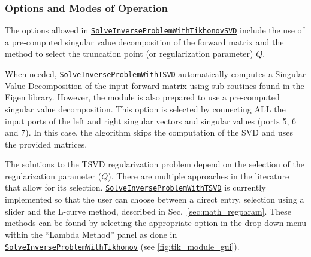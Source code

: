     
    \subsubsection{Options and Modes of Operation}
    
    The options allowed in \href{http://scirundocwiki.sci.utah.edu/SCIRunDocs/index.php5/CIBC:Documentation:SCIRun:Reference:BioPSE:SolveInverseProblemWithTikhonovSVD}{{\tt SolveInverseProblemWithTikhonovSVD}} include the use of a pre-computed singular value decomposition of the forward matrix and the method to select the truncation point (or regularization parameter) $Q$.
    
    
    When needed, \href{http://scirundocwiki.sci.utah.edu/SCIRunDocs/index.php5/CIBC:Documentation:SCIRun:Reference:BioPSE:SolveInverseProblemWithTSVD}{{\tt SolveInverseProblemWithTSVD}} automatically computes a Singular Value Decomposition of the input forward matrix using sub-routines found in the Eigen library.
    However, the module is also prepared to use a pre-computed singular value decomposition. 
    This option is selected by connecting ALL the input ports of the left and right singular vectors and singular values (ports 5, 6 and 7).
    In this case, the algorithm skips the computation of the SVD and uses the provided matrices.
    
    
    The solutions to the TSVD regularization problem depend on the selection of the regularization parameter ($Q$).
    There are multiple approaches in the literature that allow for its selection.
    \href{http://scirundocwiki.sci.utah.edu/SCIRunDocs/index.php5/CIBC:Documentation:SCIRun:Reference:BioPSE:SolveInverseProblemWithTSVD}{{\tt SolveInverseProblemWithTSVD}} is currently implemented so that the user can choose between a direct entry, selection using a slider and the L-curve method, described in Sec.~\ref{sec:math_regparam}.
    These methods can be found by selecting the appropriate option in the drop-down menu within the ``Lambda Method'' panel as done in \href{http://scirundocwiki.sci.utah.edu/SCIRunDocs/index.php/CIBC:Documentation:SCIRun:Reference:BioPSE:SolveInverseProblemWithTikhonov}{{\tt SolveInverseProblemWithTikhonov}} (see \autoref{fig:tik_module_gui}).


